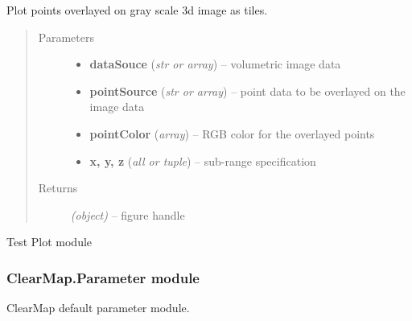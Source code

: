 \documentclass[letterpaper,10pt,english]{sphinxmanual}
\begin{document}
\begin{fulllineitems}
\label{api/ClearMap.Visualization:ClearMap.Visualization.Plot.plotOverlayPoints}
Plot points overlayed on gray scale 3d image as tiles.
\begin{quote}\begin{description}
\item[{Parameters}] \leavevmode\begin{itemize}
\item {} 
\textbf{dataSouce} (\emph{str or array}) --
volumetric image data

\item {} 
\textbf{pointSource} (\emph{str or array}) --
point data to be overlayed on the image data

\item {} 
\textbf{pointColor} (\emph{array}) --
RGB color for the overlayed points

\item {} 
\textbf{x, y, z} (\emph{all or tuple}) --
sub-range specification

\end{itemize}

\item[{Returns}] \leavevmode
\emph{(object)} --
figure handle

\end{description}\end{quote}




{\hyperref[api/ClearMap.Visualization:ClearMap.Visualization.Plot.plotTiling]{\emph{}}}



\end{fulllineitems}


\begin{fulllineitems}
\label{api/ClearMap.Visualization:ClearMap.Visualization.Plot.test}
Test Plot module

\end{fulllineitems}



\subsubsection{ClearMap.Parameter module}
\label{api/ClearMap.Parameter:module-ClearMap.Parameter}\label{api/ClearMap.Parameter:clearmap-parameter-module}\label{api/ClearMap.Parameter::doc}
ClearMap default parameter module.
\end{document}
